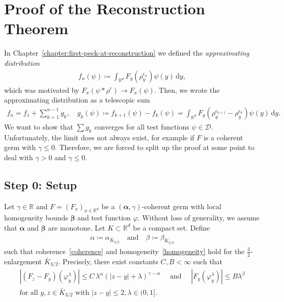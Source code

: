 
\chapter{Proof of the Reconstruction Theorem}\label{chapter:general-proof}

In Chapter~\ref{chapter:first-peek-at-reconstruction} we defined the \emph{approximating distribution} 
\begin{align*}
    f_n(\psi) \coloneqq \int_{\mathbb{R}^d} F_y(\rho_y^{\epsilon_n}) \psi(y) \, \mathrm{d}y,
\end{align*}
which was motivated by \(F_x(\psi * \rho^\epsilon) \to F_x(\psi)\). Then, we wrote the approximating distribution as a telescopic sum 
 \begin{align*}
    f_n = f_1 + \sum^{n-1}_{k=1}
    g_k, \quad g_k(\psi) \coloneqq f_{k+1}(\psi) - f_k(\psi) = \int_{\mathbb{R}^d} F_y(\rho_y^{\epsilon_{k+1}} - \rho_y^{\epsilon_k}) \psi(y)\, \mathrm{d}y.
 \end{align*}
We want to show that \( \sum g_k \) converges for all test functions \( \psi \in \mathcal{D} \). Unfortunately, the limit does not always exist, for example if \( F \) is a coherent germ with \( \gamma \leq 0 \). Therefore, we are forced to split up the proof at some point to deal with \( \gamma > 0 \) and \( \gamma \leq 0 \).

\section{Step 0: Setup}\label{setup} 

Let \(\gamma \in \mathbb{R}\) and \(F = (F_x)_{x \in \mathbb{R}^d}\) be a \((\bm \alpha, \gamma)\)-coherent germ with local homogeneity bounds \(\bm \beta\) and test function \(\varphi\). Without loss of generality, we assume that \(\bm \alpha\) and \(\bm \beta\) are monotone. Let \(K \subset \mathbb{R}^d\) be a compact set. Define 
\begin{align*}
    \alpha \coloneqq \alpha_{\bar K_{3/2}} \quad \text{and} \quad  \beta \coloneqq \beta_{\bar K_{3/2}}
\end{align*}
 such that coherence~\eqref{coherence} and homogeneity~\eqref{homogeneity} hold for the \(\frac{3}{2}\)-enlargement \(\bar K_{3/2}\). Precisely, there exist constants \(C,B < \infty\) such that
\begin{gather}\label{starter-coherence}
    |(F_z - F_y)(\varphi^\lambda_y)| \leq C \, \lambda^\alpha(|z-y| + \lambda)^{\gamma - \alpha} \quad \text{ and } \quad
    |F_y(\varphi^\lambda_y)| \leq B \lambda^\beta \\
    \text{for all } y,z \in \bar K_{3/2} \text{ with } |z-y| \leq 2,  \lambda \in (0,1]. \nonumber
\end{gather}

